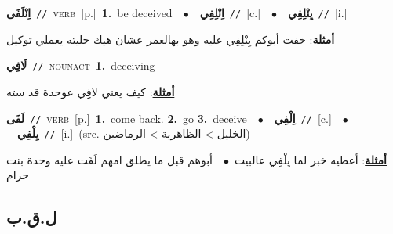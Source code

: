 \documentclass[10pt,a4paper,twoside]{article} %
\begin{document}
\begin{multicols}{2}
{\setlength\topsep{0pt}\textbf{\foreignlanguage{arabic}{اِنْلَفَى}}\ {\color{gray}\texttt{//}\color{black}}\ \textsc{verb}\ [p.]\ \textbf{1.}~be deceived\ \ $\bullet$\ \ \setlength\topsep{0pt}\textbf{\foreignlanguage{arabic}{اِنْلِفِي}}\ {\color{gray}\texttt{//}\color{black}}\ [c.]\ \ $\bullet$\ \ \setlength\topsep{0pt}\textbf{\foreignlanguage{arabic}{يِنْلِفِي}}\ {\color{gray}\texttt{//}\color{black}}\ [i.]\  \begin{flushright}\color{gray}\foreignlanguage{arabic}{\textbf{\underline{\foreignlanguage{arabic}{أمثلة}}}: خفت أبوكم يِنْلِفِي عليه وهو بهالعمر عشان هيك خليته يعملي توكيل}\end{flushright}\color{black}} \vspace{2mm}

{\setlength\topsep{0pt}\textbf{\foreignlanguage{arabic}{لَافِي}}\ {\color{gray}\texttt{//}\color{black}}\ \textsc{noun\textunderscore act}\ \textbf{1.}~deceiving\  \begin{flushright}\color{gray}\foreignlanguage{arabic}{\textbf{\underline{\foreignlanguage{arabic}{أمثلة}}}: كيف يعني لافِِي عوحدة قد سته}\end{flushright}\color{black}} \vspace{2mm}

{\setlength\topsep{0pt}\textbf{\foreignlanguage{arabic}{لَفَى}}\ {\color{gray}\texttt{//}\color{black}}\ \textsc{verb}\ [p.]\ \textbf{1.}~come back.  \textbf{2.}~go  \textbf{3.}~deceive\ \ $\bullet$\ \ \setlength\topsep{0pt}\textbf{\foreignlanguage{arabic}{اِلْفِي}}\ {\color{gray}\texttt{//}\color{black}}\ [c.]\ \ $\bullet$\ \ \setlength\topsep{0pt}\textbf{\foreignlanguage{arabic}{يِلْفِي}}\ {\color{gray}\texttt{//}\color{black}}\ [i.]\ (src. \color{gray}\foreignlanguage{arabic}{الخليل > الظاهرية > الرماضين}\color{black})\  \begin{flushright}\color{gray}\foreignlanguage{arabic}{\textbf{\underline{\foreignlanguage{arabic}{أمثلة}}}: أعطيه خبر لما يِلْفِي عالبيت\ $\bullet$\ \  أبوهم قبل ما يطلق امهم لَفَت عليه وحدة بنت حرام}\end{flushright}\color{black}} \vspace{2mm}

\vspace{-3mm}
\subsection*{\color{blue}\foreignlanguage{arabic}{ل.ق.ب}\color{blue}{}} 


\end{multicols}
\end{document}
